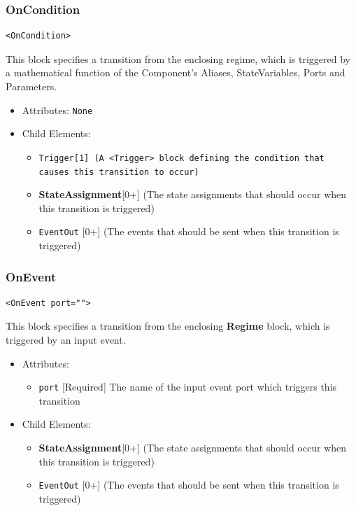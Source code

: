 \documentclass{article}
\newcommand{\StateAssignment}{{\bf{StateAssignment}}\xspace}
\newcommand{\Regime}{{\bf{Regime}}\xspace}
\newcommand{\Trigger}{\tt{Trigger}}
\begin{document}
\subsubsection{OnCondition}
%
\begin{lstlisting}
<OnCondition>
\end{lstlisting}

This block specifies a transition from the enclosing regime, which is triggered
by a mathematical function of the Component's Aliases, StateVariables, Ports and
Parameters.

\begin{itemize}
\item Attributes: \texttt{None}

\item Child Elements:
%
\begin{itemize}
\item \Trigger {[}1{]} (A \verb|<Trigger>| block defining the condition that
causes this transition to occur)
\item \StateAssignment {[}0+{]} (The state assignments that should occur when
this transition is triggered)
\item {\tt EventOut} {[}0+{]} (The events that should be sent when this
transition is triggered)
\end{itemize}
\end{itemize}

\subsubsection{OnEvent}
%
\begin{lstlisting}
<OnEvent port="">
\end{lstlisting}

This block specifies a transition from the enclosing \Regime block, which is
triggered
by an input event.

\begin{itemize}
\item Attributes:
%
\begin{itemize}
\item \verb|port| {[}Required{]} The name of the input event port which triggers
this
transition
\end{itemize}

\item Child Elements:
%
\begin{itemize}
\item \StateAssignment {[}0+{]} (The state assignments that should occur when
this transition is triggered)
\item {\tt EventOut} {[}0+{]} (The events that should be sent when this
transition is triggered)
\end{itemize}
\end{itemize}
\end{document}
